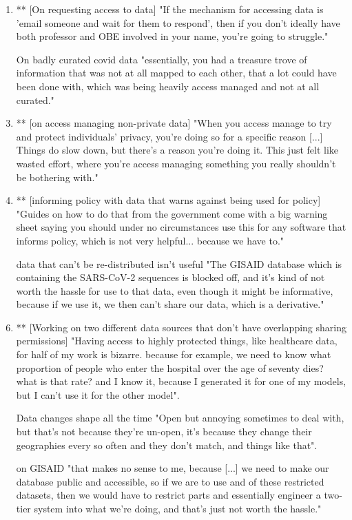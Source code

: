 
\begin{enumerate}
\item ** [On requesting access to data] "If the mechanism for accessing data is 'email someone and wait for them to respond', then if you don't ideally have both professor and OBE involved in your name, you're going to struggle."
\item [On badly curated covid data] "essentially, you had a treasure trove of information that was not at all mapped to each other, that a lot could have been done with, which was being heavily access managed and not at all curated."
\item ** [on access managing non-private data] "When you access manage to try and protect individuals' privacy, you're doing so for a specific reason [...] Things do slow down, but there's a reason you're doing it. This just felt like wasted effort, where you're access managing something you really shouldn't be bothering with."
\item ** [informing policy with data that warns against being used for policy] "Guides on how to do that from the government come with a big warning sheet saying you should under no circumstances use this for any software that informs policy, which is not very helpful... because we have to."
\item [data that can't be re-distributed isn't useful] "The GISAID database which is containing the SARS-CoV-2 sequences is blocked  off, and it's kind of not worth the hassle for use to that data, even though it might be informative, because if we use it, we then can't share our data, which is a derivative."
\item ** [Working on two different data sources that don't have overlapping sharing permissions] "Having access to highly protected things, like healthcare data, for half of my work is bizarre. because for example, we need to know what proportion of people who enter the hospital over the age of seventy dies? what is that rate? and I know it, because I generated it for one of my models, but I can't use it for the other model".
\item  [Data changes shape all the time] "Open but annoying sometimes to deal with, but that's not because they're un-open, it's because they change their geographies every so often and they don't match, and things like that".
\item  [on GISAID] "that makes no sense to me, because [...] we need to make our database public and accessible, so if we are to use and of these restricted datasets, then we would have to restrict parts and essentially engineer a two-tier system into what we're doing, and that's just not worth the hassle."

\end{enumerate}
